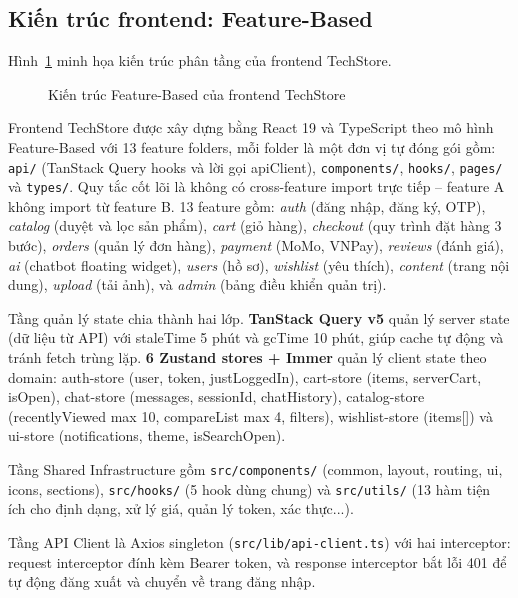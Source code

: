 \subsection{Kiến trúc frontend: Feature-Based}

Hình~\ref{fig:frontend_architecture} minh họa kiến trúc phân tầng của frontend TechStore.

\begin{figure}[H]
  \centering
  \caption{Kiến trúc Feature-Based của frontend TechStore}
  \label{fig:frontend_architecture}
\end{figure}

\begin{sloppypar}
Frontend TechStore được xây dựng bằng React 19 và TypeScript theo mô hình Feature-Based với 13 feature folders, mỗi folder là một đơn vị tự đóng gói gồm: \texttt{api/} (TanStack Query hooks và lời gọi apiClient), \texttt{components/}, \texttt{hooks/}, \texttt{pages/} và \texttt{types/}. Quy tắc cốt lõi là không có cross-feature import trực tiếp -- feature A không import từ feature B. 13 feature gồm: \textit{auth} (đăng nhập, đăng ký, OTP), \textit{catalog} (duyệt và lọc sản phẩm), \textit{cart} (giỏ hàng), \textit{checkout} (quy trình đặt hàng 3 bước), \textit{orders} (quản lý đơn hàng), \textit{payment} (MoMo, VNPay), \textit{reviews} (đánh giá), \textit{ai} (chatbot floating widget), \textit{users} (hồ sơ), \textit{wishlist} (yêu thích), \textit{content} (trang nội dung), \textit{upload} (tải ảnh), và \textit{admin} (bảng điều khiển quản trị).
\end{sloppypar}

Tầng quản lý state chia thành hai lớp. \textbf{TanStack Query v5} quản lý server state (dữ liệu từ API) với staleTime 5 phút và gcTime 10 phút, giúp cache tự động và tránh fetch trùng lặp. \textbf{6 Zustand stores + Immer} quản lý client state theo domain: auth-store (user, token, justLoggedIn), cart-store (items, serverCart, isOpen), chat-store (messages, sessionId, chatHistory), catalog-store (recentlyViewed max 10, compareList max 4, filters), wishlist-store (items[]) và ui-store (notifications, theme, isSearchOpen).

Tầng Shared Infrastructure gồm \texttt{src/components/} (common, layout, routing, ui, icons, sections), \texttt{src/hooks/} (5 hook dùng chung) và \texttt{src/utils/} (13 hàm tiện ích cho định dạng, xử lý giá, quản lý token, xác thực...).

Tầng API Client là Axios singleton (\texttt{src/lib/api-client.ts}) với hai interceptor: request interceptor đính kèm Bearer token, và response interceptor bắt lỗi 401 để tự động đăng xuất và chuyển về trang đăng nhập.

